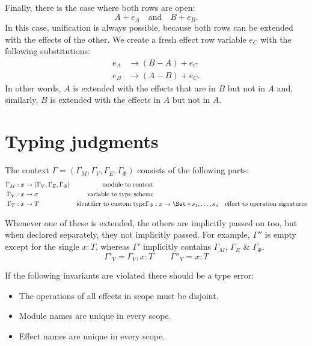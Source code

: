 Finally, there is the case where both rows are open:
\[ A + e_A \quad\text{and}\quad B + e_B. \]
In this case, unification is always possible, because both rows can be extended with the effects of the other. We create a fresh effect row variable $e_C$ with the following substitutions:
\begin{align*}
    e_A &\to (B - A) + e_C \\
    e_B &\to (A - B) + e_C.
\end{align*}
In other words, $A$ is extended with the effects that are in $B$ but not in $A$ and, similarly, $B$ is extended with the effects in $A$ but not in $A$.


\section{Typing judgments}

The context $\Gamma = (\Gamma_M, \Gamma_V, \Gamma_E, \Gamma_\Phi)$ consists of the following parts:
\begin{align*}
    \Gamma_M &: x \to (\Gamma_V, \Gamma_E, \Gamma_\Phi) & \text{module to context}\\
    \Gamma_V &: x \to \sigma & \text{variable to type scheme}\\
    \Gamma_T &: x \to T & \text{identifier to custom type}
    \Gamma_\Phi &: x \to \S{s_1,\dots,s_n} & \text{effect to operation signatures}
\end{align*}


Whenever one of these is extended, the others are implicitly passed on too, but when declared separately, they not implicitly passed. For example, $\Gamma''$ is empty except for the single $x: T$, whereas $\Gamma'$ implicitly contains $\Gamma_M$, $\Gamma_E$ \& $\Gamma_\Phi$.
\[ \Gamma'_V = \Gamma_V, x: T \qquad \Gamma''_V = x: T \]

If the following invariants are violated there should be a type error:

\begin{itemize}
    \item The operations of all effects in scope must be disjoint.
    \item Module names are unique in every scope.
    \item Effect names are unique in every scope.
\end{itemize}


